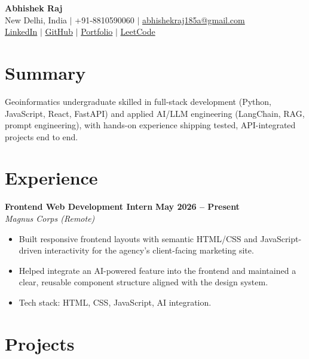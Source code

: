 \documentclass[10pt,letterpaper]{article}
\newcommand{\entry}[4]{%
    \textbf{#1} \hfill \textbf{#3}\\
    \textit{#2} \hfill \textit{#4}\\[0pt]
}
\begin{document}
\begin{center}
    {\LARGE \textbf{Abhishek Raj}}\\[4pt]
    New Delhi, India \quad $\vert$ \quad +91-8810590060 \quad $\vert$ \quad \href{mailto:abhishekraj185a@gmail.com}{abhishekraj185a@gmail.com}\\[2pt]
    \href{https://www.linkedin.com/in/abhishekraj0011/}{LinkedIn} \quad $\vert$ \quad
    \href{https://github.com/i-abhishek-04}{GitHub} \quad $\vert$ \quad
    \href{https://portfolio-theta-blue-ykgevsy0wm.vercel.app/}{Portfolio} \quad $\vert$ \quad
    \href{https://leetcode.com/u/iAbHi__004/}{LeetCode}
\end{center}

\vspace{-4pt}

\section*{Summary}
Geoinformatics undergraduate skilled in full-stack development (Python, JavaScript, React, FastAPI) and applied AI/LLM engineering (LangChain, RAG, prompt engineering), with hands-on experience shipping tested, API-integrated projects end to end.

\section*{Experience}

\entry{Frontend Web Development Intern}{Magnus Corps (Remote)}{May 2026 -- Present}{}
\vspace{-4pt}
\begin{itemize}
    \item Built responsive frontend layouts with semantic HTML/CSS and JavaScript-driven interactivity for the agency's client-facing marketing site.
    \item Helped integrate an AI-powered feature into the frontend and maintained a clear, reusable component structure aligned with the design system.
    \item Tech stack: HTML, CSS, JavaScript, AI integration.
\end{itemize}

\section*{Projects}
\end{document}

